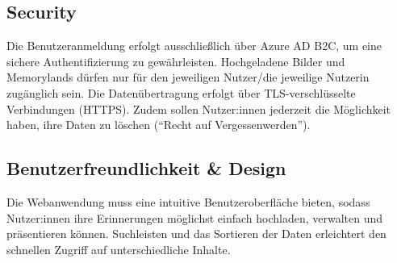 \subsection{Security}

Die Benutzeranmeldung erfolgt ausschlie\ss{}lich über Azure AD B2C, um eine sichere 
Authentifizierung zu gewährleisten. Hochgeladene Bilder und Memorylands dürfen nur 
für den jeweiligen Nutzer/die jeweilige Nutzerin zugänglich sein. Die Datenübertragung 
erfolgt über TLS-verschlüsselte Verbindungen (HTTPS). Zudem sollen Nutzer:innen jederzeit 
die Möglichkeit haben, ihre Daten zu löschen (``Recht auf Vergessenwerden'').

\subsection{Benutzerfreundlichkeit \& Design}

Die Webanwendung muss eine intuitive Benutzeroberfläche bieten, sodass Nutzer:innen ihre 
Erinnerungen möglichst einfach hochladen, verwalten und präsentieren können. 
Suchleisten und das Sortieren der Daten erleichtert den schnellen Zugriff auf 
unterschiedliche Inhalte.
